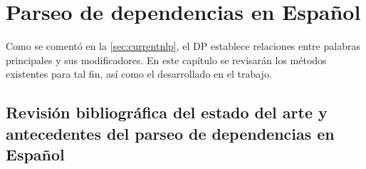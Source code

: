 \chapter{Parseo de dependencias en Español}\label{ch:depparsing}









Como se comentó en la \autoref{sec:currentnlp}, el \ac{DP} establece relaciones
entre palabras principales y sus modificadores. En este capítulo se revisarán
los métodos existentes para tal fin, así como el desarrollado en el trabajo.

\section{Revisión bibliográfica del estado del arte y antecedentes del parseo de
  dependencias en Español}
\label{sec:revBibliografica}

